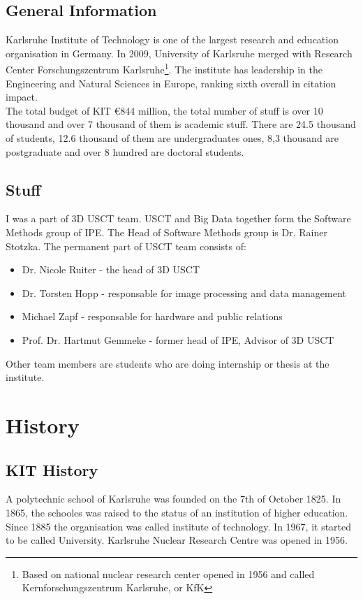 \documentclass[english]{article}
\begin{document}
\subsection{General Information}

Karlsruhe Institute of Technology is one of the largest research and education organisation in Germany. In 2009, University of Karlsruhe merged with Research Center Forschungszentrum Karlsruhe\footnote{Based on national nuclear research center opened in 1956 and called Kernforschungszentrum Karlsruhe, or KfK}. The institute has leadership in the Engineering and Natural Sciences in Europe, ranking sixth overall in citation impact.\\

The total budget of KIT \euro 844 million, the total number of stuff is over 10 thousand and over 7 thousand of them is academic stuff. There are 24.5 thousand of students, 12.6 thousand of them are undergraduates ones, 8,3 thousand are postgraduate and over 8 hundred are doctoral students.
\subsection{Stuff}

I was a part of 3D USCT team. USCT and Big Data together form the Software Methods group of IPE. The Head of Software Methods group is Dr. Rainer Stotzka. The permanent part of USCT team consists of:
\begin{itemize}
\item Dr. Nicole Ruiter - the head of 3D USCT
\item Dr. Torsten Hopp - responsable for image processing and data management
\item Michael Zapf - responsable for hardware and public relations
\item Prof. Dr. Hartmut Gemmeke - former head of IPE, Advisor of 3D USCT
\end{itemize}
Other team members are students who are doing internship or thesis at the institute.

\section{History}

\subsection{KIT History}

A polytechnic school of Karlsruhe was founded on the 7th of October 1825. In 1865, the schooles was raised to the status of an institution of higher education. Since 1885 the organisation was called institute of technology. In 1967, it started to be called University. Karlsruhe Nuclear Research Centre was opened in 1956. \\
\end{document}
